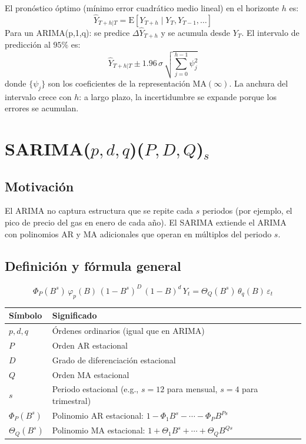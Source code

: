 \documentclass[12pt,a4paper]{article}
\theoremstyle{definition}
\begin{document}
El pronóstico óptimo (mínimo error cuadrático medio lineal) en el horizonte $h$
es:
\[
  \hat{Y}_{T+h|T} = \mathrm{E}[Y_{T+h} \mid Y_T, Y_{T-1}, \ldots]
\]
Para un ARIMA(p,1,q): se predice $\Delta \hat{Y}_{T+h}$ y se acumula desde $Y_T$.
El intervalo de predicción al $95\%$ es:
\[
  \hat{Y}_{T+h|T} \pm 1.96\,\sigma\,\sqrt{\sum_{j=0}^{h-1}\psi_j^2}
\]
donde $\{\psi_j\}$ son los coeficientes de la representación MA$(\infty)$. La
anchura del intervalo crece con $h$: a largo plazo, la incertidumbre se
expande porque los errores se acumulan.

\section{SARIMA($p,d,q$)($P,D,Q$)$_s$}

\subsection{Motivación}

El ARIMA no captura estructura que se repite cada $s$ periodos (por ejemplo,
el pico de precio del gas en enero de cada año). El SARIMA extiende el ARIMA
con polinomios AR y MA adicionales que operan en múltiplos del periodo $s$.

\subsection{Definición y fórmula general}

\begin{defbox}[SARIMA($p,d,q$)($P,D,Q$)$_s$]
\[
  \boxed{\Phi_P(B^s)\,\varphi_p(B)\,(1-B^s)^D\,(1-B)^d\,Y_t
  = \Theta_Q(B^s)\,\theta_q(B)\,\varepsilon_t}
\]
\begin{center}
\begin{tabular}{ll}
\toprule
Símbolo & Significado \\
\midrule
$p,d,q$ & Órdenes ordinarios (igual que en ARIMA) \\
$P$ & Orden AR estacional \\
$D$ & Grado de diferenciación estacional \\
$Q$ & Orden MA estacional \\
$s$ & Periodo estacional (e.g., $s=12$ para mensual, $s=4$ para trimestral) \\
$\Phi_P(B^s)$ & Polinomio AR estacional: $1-\Phi_1 B^s - \cdots - \Phi_P B^{Ps}$ \\
$\Theta_Q(B^s)$ & Polinomio MA estacional: $1+\Theta_1 B^s + \cdots + \Theta_Q B^{Qs}$ \\
\bottomrule
\end{tabular}
\end{center}
\end{defbox}
\end{document}
